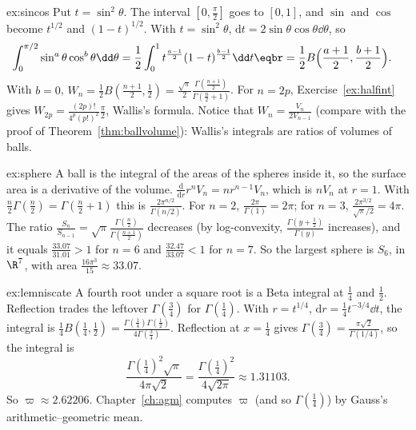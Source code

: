 \begin{solution}{ex:sincos}
\idea Put $t=\sin^2\theta$. The interval $[0,\frac\pi2]$ goes to $[0,1]$, and $\sin$ and $\cos$ become $t^{1/2}$ and $(1-t)^{1/2}$.
\writeup With $t=\sin^2\theta$, $\mathrm dt=2\sin\theta\cos\theta\dd\theta$, so
\[
\begin{aligned}\int_0^{\pi/2}\sin^a\theta\cos^b\theta\dd\theta&=\frac12\int_0^1t^{\frac{a-1}2}(1-t)^{\frac{b-1}2}\dd t\eqbr=\frac12B\Bigl(\frac{a+1}2,\frac{b+1}2\Bigr).\end{aligned}
\]
With $b=0$, $W_n=\frac12B(\frac{n+1}2,\frac12)=\frac{\sqrt\pi}2\frac{\Gamma(\frac{n+1}2)}{\Gamma(\frac n2+1)}$. For $n=2p$, Exercise~\ref{ex:halfint} gives
$W_{2p}=\frac{(2p)!}{4^p(p!)^2}\frac\pi2$, Wallis's formula. Notice that $W_n=\frac{V_n}{2V_{n-1}}$ (compare with the proof of Theorem~\ref{thm:ballvolume}): Wallis's integrals are
ratios of volumes of balls.
\end{solution}

\begin{solution}{ex:sphere}
\idea A ball is the integral of the areas of the spheres inside it, so the surface area is a derivative of the volume.
\writeup $\frac{\mathrm d}{\mathrm dr}r^nV_n=nr^{n-1}V_n$, which is $nV_n$ at $r=1$. With $\frac n2\Gamma(\frac n2)=\Gamma(\frac n2+1)$ this is
$\frac{2\pi^{n/2}}{\Gamma(n/2)}$. For $n=2$, $\frac{2\pi}{\Gamma(1)}=2\pi$; for $n=3$, $\frac{2\pi^{3/2}}{\sqrt\pi/2}=4\pi$. The ratio
$\frac{S_n}{S_{n-1}}=\sqrt\pi\frac{\Gamma(\frac n2)}{\Gamma(\frac{n+1}2)}$ decreases (by log-convexity, $\frac{\Gamma(y+\frac12)}{\Gamma(y)}$ increases), and it equals
$\frac{33.07}{31.01}>1$ for $n=6$ and $\frac{32.47}{33.07}<1$ for $n=7$. So the largest sphere is $S_6$, in $\R^7$, with area
$\frac{16\pi^3}{15}\approx33.07$.
\end{solution}

\begin{solution}{ex:lemniscate}
\idea A fourth root under a square root is a Beta integral at $\frac14$ and $\frac12$. Reflection trades the leftover $\Gamma(\frac34)$ for $\Gamma(\frac14)$.
\writeup With $r=t^{1/4}$, $\mathrm dr=\frac14t^{-3/4}\dd t$, the integral is $\frac14B(\frac14,\frac12)=\frac{\Gamma(\frac14)\Gamma(\frac12)}{4\Gamma(\frac34)}$. Reflection at
$x=\frac14$ gives $\Gamma(\frac34)=\frac{\pi\sqrt2}{\Gamma(1/4)}$, so the integral is
\[
\frac{\Gamma(\frac14)^2\sqrt\pi}{4\pi\sqrt2}=\frac{\Gamma(\frac14)^2}{4\sqrt{2\pi}}\approx1.31103.
\]
So $\varpi\approx2.62206$. Chapter~\ref{ch:agm} computes $\varpi$ (and so $\Gamma(\frac14)$) by Gauss's arithmetic--geometric mean.
\end{solution}

